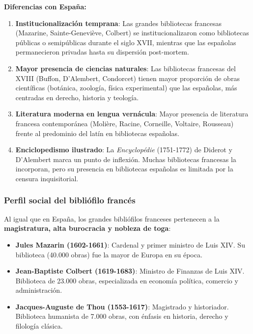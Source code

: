 \documentclass[11pt,a4paper]{article}
\begin{document}
\textbf{Diferencias con España:}

\begin{enumerate}
\item \textbf{Institucionalización temprana}: Las grandes bibliotecas francesas (Mazarine, Sainte-Geneviève, Colbert) se institucionalizaron como bibliotecas públicas o semipúblicas durante el siglo XVII, mientras que las españolas permanecieron privadas hasta su dispersión post-mortem.

\item \textbf{Mayor presencia de ciencias naturales}: Las bibliotecas francesas del XVIII (Buffon, D'Alembert, Condorcet) tienen mayor proporción de obras científicas (botánica, zoología, física experimental) que las españolas, más centradas en derecho, historia y teología.

\item \textbf{Literatura moderna en lengua vernácula}: Mayor presencia de literatura francesa contemporánea (Molière, Racine, Corneille, Voltaire, Rousseau) frente al predominio del latín en bibliotecas españolas.

\item \textbf{Enciclopedismo ilustrado}: La \textit{Encyclopédie} (1751-1772) de Diderot y D'Alembert marca un punto de inflexión. Muchas bibliotecas francesas la incorporan, pero su presencia en bibliotecas españolas es limitada por la censura inquisitorial.
\end{enumerate}

\subsubsection{Perfil social del bibliófilo francés}

Al igual que en España, los grandes bibliófilos franceses pertenecen a la \textbf{magistratura, alta burocracia y nobleza de toga}:

\begin{itemize}
\item \textbf{Jules Mazarin (1602-1661)}: Cardenal y primer ministro de Luis XIV. Su biblioteca (40.000 obras) fue la mayor de Europa en su época.
\item \textbf{Jean-Baptiste Colbert (1619-1683)}: Ministro de Finanzas de Luis XIV. Biblioteca de 23.000 obras, especializada en economía política, comercio y administración.
\item \textbf{Jacques-Auguste de Thou (1553-1617)}: Magistrado y historiador. Biblioteca humanista de 7.000 obras, con énfasis en historia, derecho y filología clásica.
\end{itemize}
\end{document}

